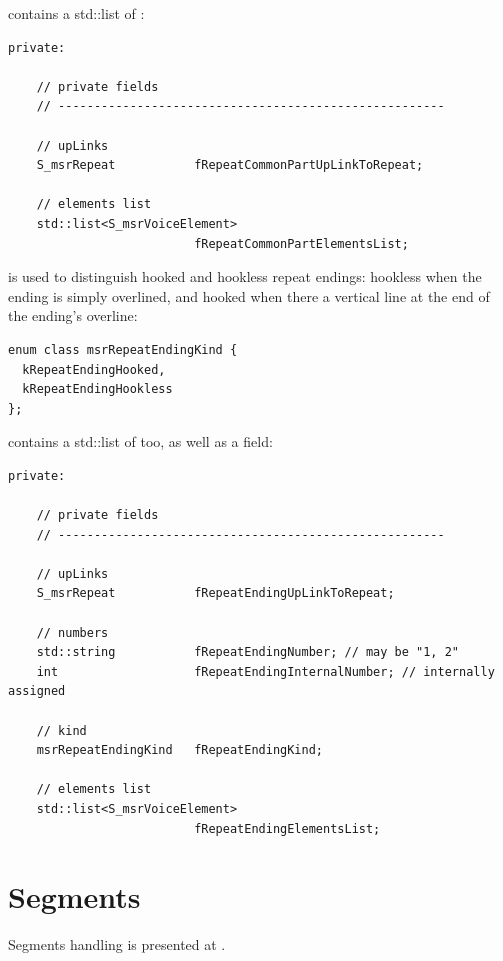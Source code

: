  contains a std::list of :
\begin{lstlisting}[language=CPlusPlus]
  private:

    // private fields
    // ------------------------------------------------------

    // upLinks
    S_msrRepeat           fRepeatCommonPartUpLinkToRepeat;

    // elements list
    std::list<S_msrVoiceElement>
                          fRepeatCommonPartElementsList;
\end{lstlisting}

 is used to distinguish hooked and hookless repeat endings: hookless when the ending is simply overlined, and hooked when there a vertical line at the end of the ending's overline:
\begin{lstlisting}[language=CPlusPlus]
enum class msrRepeatEndingKind {
  kRepeatEndingHooked,
  kRepeatEndingHookless
};
\end{lstlisting}

 contains a std::list of  too, as well as a  field:
\begin{lstlisting}[language=CPlusPlus]
  private:

    // private fields
    // ------------------------------------------------------

    // upLinks
    S_msrRepeat           fRepeatEndingUpLinkToRepeat;

    // numbers
    std::string           fRepeatEndingNumber; // may be "1, 2"
    int                   fRepeatEndingInternalNumber; // internally assigned

    // kind
    msrRepeatEndingKind   fRepeatEndingKind;

    // elements list
    std::list<S_msrVoiceElement>
                          fRepeatEndingElementsList;
\end{lstlisting}


\section{Segments}\label{Segments}

Segments handling is presented at .


